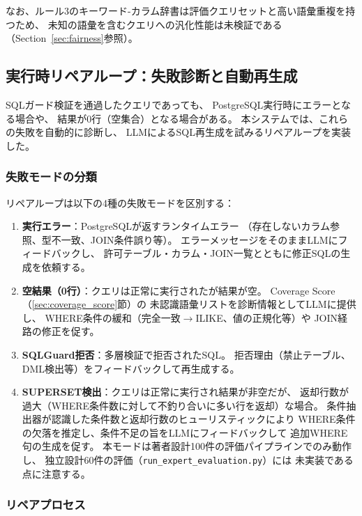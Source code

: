 \documentclass[5p,twocolumn]{elsarticle}
\begin{document}
なお、ルール3のキーワード-カラム辞書は評価クエリセットと高い語彙重複を持つため、
未知の語彙を含むクエリへの汎化性能は未検証である（Section~\ref{sec:fairness}参照）。

\subsection{実行時リペアループ：失敗診断と自動再生成}
\label{sec:repair_loop}

SQLガード検証を通過したクエリであっても、
PostgreSQL実行時にエラーとなる場合や、
結果が0行（空集合）となる場合がある。
本システムでは、これらの失敗を自動的に診断し、
LLMによるSQL再生成を試みるリペアループを実装した。

\subsubsection{失敗モードの分類}

リペアループは以下の4種の失敗モードを区別する：

\begin{enumerate}
  \item \textbf{実行エラー}：PostgreSQLが返すランタイムエラー
    （存在しないカラム参照、型不一致、JOIN条件誤り等）。
    エラーメッセージをそのままLLMにフィードバックし、
    許可テーブル・カラム・JOIN一覧とともに修正SQLの生成を依頼する。
  \item \textbf{空結果（0行）}：クエリは正常に実行されたが結果が空。
    Coverage Score（\ref{sec:coverage_score}節）の
    未認識語彙リストを診断情報としてLLMに提供し、
    WHERE条件の緩和（完全一致$\to$ILIKE、値の正規化等）や
    JOIN経路の修正を促す。
  \item \textbf{SQLGuard拒否}：多層検証で拒否されたSQL。
    拒否理由（禁止テーブル、DML検出等）をフィードバックして再生成する。
  \item \textbf{SUPERSET検出}：クエリは正常に実行され結果が非空だが、
    返却行数が過大（WHERE条件数に対して不釣り合いに多い行を返却）な場合。
    条件抽出器が認識した条件数と返却行数のヒューリスティックにより
    WHERE条件の欠落を推定し、条件不足の旨をLLMにフィードバックして
    追加WHERE句の生成を促す。
    本モードは著者設計100件の評価パイプラインでのみ動作し、
    独立設計60件の評価（\texttt{run\_expert\_evaluation.py}）には
    未実装である点に注意する。
\end{enumerate}

\subsubsection{リペアプロセス}
\end{document}
